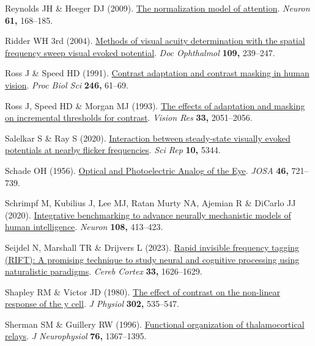 \documentclass[
  letterpaper,
  DIV=11,
  numbers=noendperiod]{scrartcl}
\newlength{\cslhangindent}
\newenvironment{CSLReferences}[2] %
 {\begin{list}{}{%
  \setlength{\itemindent}{0pt}
  \setlength{\leftmargin}{0pt}
  \setlength{\parsep}{0pt}
  \ifodd #1
   \setlength{\leftmargin}{\cslhangindent}
   \setlength{\itemindent}{-1\cslhangindent}
  \fi
  \setlength{\itemsep}{#2\baselineskip}}}
 {\end{list}}
\begin{document}
\begin{CSLReferences}{1}{1}
Reynolds JH \& Heeger DJ (2009).
\href{https://doi.org/10.1016/j.neuron.2009.01.002}{The normalization
model of attention}. \emph{Neuron} \textbf{61,} 168--185.

Ridder WH 3rd (2004).
\href{https://doi.org/10.1007/s10633-004-8053-7}{Methods of visual
acuity determination with the spatial frequency sweep visual evoked
potential}. \emph{Doc Ophthalmol} \textbf{109,} 239--247.

Ross J \& Speed HD (1991).
\href{https://doi.org/10.1098/rspb.1991.0125}{Contrast adaptation and
contrast masking in human vision}. \emph{Proc Biol Sci} \textbf{246,}
61--69.

Ross J, Speed HD \& Morgan MJ (1993).
\href{https://doi.org/10.1016/0042-6989(93)90003-f}{The effects of
adaptation and masking on incremental thresholds for contrast}.
\emph{Vision Res} \textbf{33,} 2051--2056.

Salelkar S \& Ray S (2020).
\href{https://doi.org/10.1038/s41598-020-62180-y}{Interaction between
steady-state visually evoked potentials at nearby flicker frequencies}.
\emph{Sci Rep} \textbf{10,} 5344.

Schade OH (1956). \href{https://doi.org/10.1364/JOSA.46.000721}{Optical
and {Photoelectric Analog} of the {Eye}}. \emph{JOSA} \textbf{46,}
721--739.

Schrimpf M, Kubilius J, Lee MJ, Ratan Murty NA, Ajemian R \& DiCarlo JJ
(2020). \href{https://doi.org/10.1016/j.neuron.2020.07.040}{Integrative
benchmarking to advance neurally mechanistic models of human
intelligence}. \emph{Neuron} \textbf{108,} 413--423.

Seijdel N, Marshall TR \& Drijvers L (2023).
\href{https://doi.org/10.1093/cercor/bhac160}{Rapid invisible frequency
tagging (RIFT): A promising technique to study neural and cognitive
processing using naturalistic paradigms}. \emph{Cereb Cortex}
\textbf{33,} 1626--1629.

Shapley RM \& Victor JD (1980).
\href{https://doi.org/10.1113/jphysiol.1980.sp013259}{The effect of
contrast on the non-linear response of the y cell}. \emph{J Physiol}
\textbf{302,} 535--547.

Sherman SM \& Guillery RW (1996).
\href{https://doi.org/10.1152/jn.1996.76.3.1367}{Functional organization
of thalamocortical relays}. \emph{J Neurophysiol} \textbf{76,}
1367--1395.


\end{CSLReferences}
\end{document}
